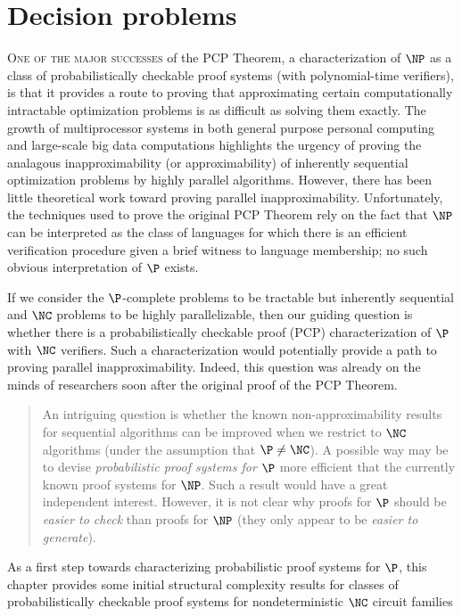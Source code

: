 \newcommand{\PCPcs}[5]{\PCP^{#1}_{#2, #3}\left[#4, #5\right]}
\newcommand{\loglog}{\log\log}
\newcommand{\ceil}[1]{\left\lceil{#1}\right\rceil}
\newcommand{\FSAT}{\textsc{FSat}}

\chapter{Decision problems}
\label{chp:decision}

%
%
%
\lettrine{O}{ne of the major successes} of the PCP Theorem, a characterization of $\NP$ as a class of probabilistically checkable proof systems (with polynomial-time verifiers), is that it provides a route to proving that approximating certain computationally intractable optimization problems is as difficult as solving them exactly.
%
%
%
The growth of multiprocessor systems in both general purpose personal computing and large-scale big data computations highlights the urgency of proving the analagous inapproximability (or approximability) of inherently sequential optimization problems by highly parallel algorithms.
However, there has been little theoretical work toward proving parallel inapproximability.
Unfortunately, the techniques used to prove the original PCP Theorem rely on the fact that $\NP$ can be interpreted as the class of languages for which there is an efficient verification procedure given a brief witness to language membership; no such obvious interpretation of $\P$ exists.

If we consider the $\P$-complete problems to be tractable but inherently sequential and $\NC$ problems to be highly parallelizable, then our guiding question is whether there is a probabilistically checkable proof (PCP) characterization of $\P$ with $\NC$ verifiers.
Such a characterization would potentially provide a path to proving parallel inapproximability.
Indeed, this question was already on the minds of researchers soon after the original proof of the PCP Theorem.
\begin{quote}
  An intriguing question is whether the known non-approximability results for sequential algorithms can be improved when we restrict to $\NC$ algorithms (under the assumption that $\P \neq \NC$).
  A possible way may be to devise \emph{probabilistic proof systems for $\P$} more efficient that the currently known proof systems for $\NP$.
  Such a result would have a great independent interest.
  However, it is not clear why proofs for $\P$ should be \emph{easier to check} than proofs for $\NP$ (they only appear to be \emph{easier to generate}).~\autocite{trevisan98}
\end{quote}
%
%
%
As a first step towards characterizing probabilistic proof systems for $\P$,
%
%
%
this chapter provides some initial structural complexity results for classes of probabilistically checkable proof systems for nondeterministic $\NC$ circuit families

